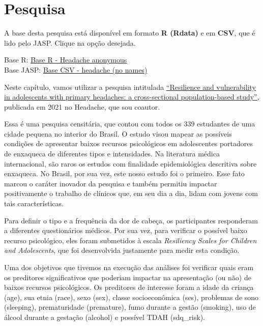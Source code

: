 \documentclass[
]{book}
\begin{document}
\hypertarget{pesquisa-10}{%
\section{Pesquisa}\label{pesquisa-10}}

\begin{base}

A base desta pesquisa está disponível em formato \textbf{R (Rdata)} e em \textbf{CSV}, que é lido pelo JASP. Clique na opção desejada.

Base R: \href{https://github.com/anovabr/mqt/raw/master/bases/Base\%20R\%20-\%20Headache\%20anonymous.RData}{Base R - Headache anonymous}\\
Base JASP: \href{https://github.com/anovabr/mqt/raw/master/bases/bases_csv_jasp.zip}{Base CSV - headache (no names)}

\end{base}

Neste capítulo, vamos utilizar a pesquisa intitulada \href{www.google.com}{``Resilience and vulnerability in adolescents with primary headaches: a cross-sectional population-based study''}, publicada em 2021 no Headache, que sou coautor.

Essa é uma pesquisa censitária, que contou com todos os 339 estudantes de uma cidade pequena no interior do Brasil. O estudo visou mapear as possíveis condições de apresentar baixos recursos psicológicos em adolescentes portadores de enxaqueca de diferentes tipos e intensidades. Na literatura médica internacional, são raros os estudos com finalidade epidemiológica descritiva sobre enxaqueca. No Brasil, por sua vez, este nosso estudo foi o primeiro. Esse fato marcou o caráter inovador da pesquisa e também permitiu impactar positivamente o trabalho de clínicos que, em seu dia a dia, lidam com jovens com tais características.

Para definir o tipo e a frequência da dor de cabeça, os participantes responderam a diferentes questionários médicos. Por sua vez, para verificar o possível baixo recurso psicológico, eles foram submetidos à escala \emph{Resiliency Scales for Children and Adolescents}, que foi desenvolvida justamente para medir esta condição.

Uma dos objetivos que tivemos na execução das análises foi verificar quais eram os preditores significativos que poderiam impactar na apresentação (ou não) de baixos recursos psicológicos. Os preditores de interesse foram a idade da criança (age), sua etnia (race), sexo (sex), classe socioeconômica (ses), problemas de sono (sleeping), prematuridade (premature), fumo durante a gestão (smoking), uso de álcool durante a gestação (alcohol) e possível TDAH (sdq\_risk).
\end{document}
